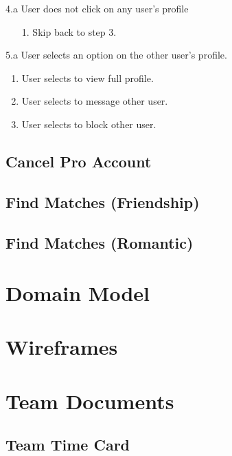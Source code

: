 \documentclass[10pt, draft]{article}
\begin{document}
\begin{usecase}
{\begin{enumerate}
\begin{enumerate}
			\end{enumerate}
		\end{enumerate}
		\item[4.a] User does not click on any user's profile
		\begin{enumerate}
			\item[1.] Skip back to step 3.
		\end{enumerate}
		\item[5.a] User selects an option on the other user's profile.
		\begin{enumerate}
			\item User selects to view full profile.
			\item User selects to message other user.
			\item User selects to block other user.
		\end{enumerate}
	}
\end{usecase}
\subsection{Cancel Pro Account}
\subsection{Find Matches (Friendship)}
\subsection{Find Matches (Romantic)}

\section{Domain Model}

\section{Wireframes}

\section{Team Documents}
\subsection{Team Time Card}
\end{document}
